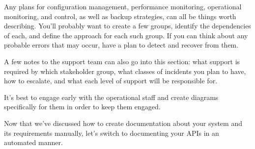 Any plans for configuration management, performance monitoring, operational monitoring, and control, as well as backup strategies, can all be things worth describing. You'll probably want to create a few groups, identify the dependencies of each, and define the approach for each such group. If you can think about any probable errors that may occur, have a plan to detect and recover from them.

A few notes to the support team can also go into this section: what support is required by which stakeholder group, what classes of incidents you plan to have, how to escalate, and what each level of support will be responsible for.

It's best to engage early with the operational staff and create diagrams specifically for them in order to keep them engaged.

Now that we've discussed how to create documentation about your system and its requirements manually, let's switch to documenting your APIs in an automated manner.









